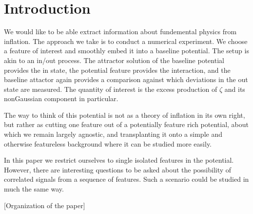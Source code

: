 
\section{Introduction} \label{sec:intro}


We would like to be able extract information about fundemental physics from inflation.
The approach we take is to conduct a numerical experiment.
We choose a feature of interest and smoothly embed it into a baseline potential.
The setup is akin to an in/out process. The attractor solution of the baseline potential provides the in state, the potential feature provides the interaction, and the baseline attactor again provides a comparison against which deviations in the out state are measured.
The quantity of interest is the excess production of $\zeta$ and its nonGaussian component in particular.

The way to think of this potential is not as a theory of inflation in its own right, but rather as cutting one feature out of a potentially feature rich potential, about which we remain largely agnostic, and transplanting it onto a simple and otherwise featureless background where it can be studied more easily.

In this paper we restrict ourselves to single isolated features in the potential. However, there are interesting questions to be asked about the possibility of correlated signals from a sequence of features. Such a scenario could be studied in much the same way.

[Organization of the paper]
